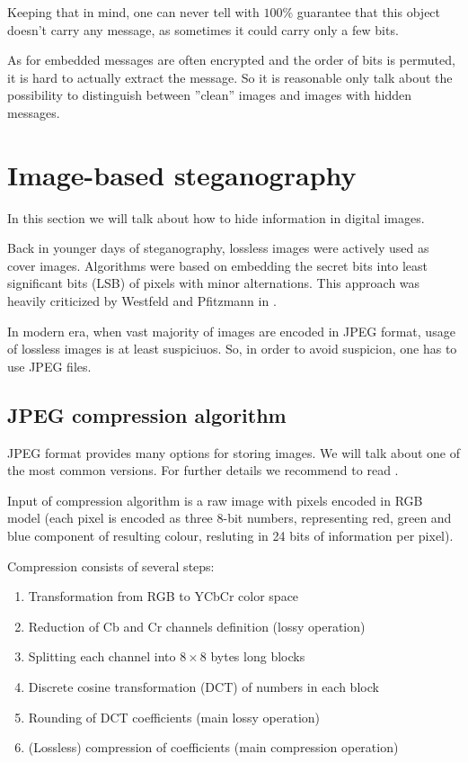 Keeping that in mind, one can never tell with $100\%$
guarantee that this object doesn't carry any message, as sometimes it could carry only a few bits.

As for embedded messages are often encrypted and the order of bits is permuted, it is hard
to actually extract the message. So it is reasonable only talk about the possibility to
distinguish between ''clean'' images and images with hidden messages. 

\section{Image-based steganography}
\label{sec:image-steganography}

In this section we will talk about how to hide information in digital images.

Back in younger days of steganography, lossless images were actively used as cover images.
Algorithms were based on embedding the secret bits into least significant bits (LSB) of pixels
with minor alternations. This approach was heavily criticized by Westfeld and Pfitzmann in \cite{westfeld1999attacks}.

In modern era, when vast majority of images are encoded in JPEG format, usage of lossless images
is at least suspiciuos. So, in order to avoid suspicion, one has to use JPEG files.

\subsection{JPEG compression algorithm}
\label{sec:jpeg}

JPEG format provides many options for storing images. We will talk about
one of the most common versions. For further details we recommend to read \cite{wallace1992jpeg}.

Input of compression algorithm is a raw image with pixels encoded
in RGB model (each pixel is encoded as three 8-bit numbers, representing
red, green and blue component of resulting colour, resluting in 24 bits of information
per pixel).

Compression consists of several steps:
\begin{enumerate}
    \item Transformation from RGB to YCbCr color space
    \item Reduction of Cb and Cr channels definition (lossy operation)
    \item Splitting each channel into $8 \times 8$ bytes long blocks 
    \item Discrete cosine transformation (DCT) of numbers in each block
    \item Rounding of DCT coefficients (main lossy operation)
    \item (Lossless) compression of coefficients (main compression operation)
\end{enumerate}

